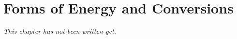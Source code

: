 \chapter{Forms of Energy and Conversions}\label{ch:g9:energy-conversions}


\emph{This chapter has not been written yet.}
